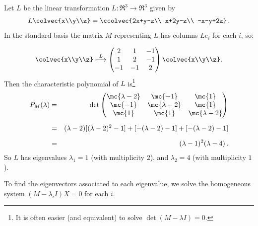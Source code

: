 \begin{example}
Let $L$ be the linear transformation $L \colon \Re^3\rightarrow \Re^3$ given by 
\[L\colvec{x\\y\\z}=\ccolvec{2x+y-z\\ x+2y-z\\ -x-y+2z}\, .\] 
In the standard basis the matrix $M$ representing $L$ has columns $Le_i$ for each $i$, so:

\[
\colvec{x\\y\\z} \stackrel{L}{\longmapsto} 
\begin{pmatrix}
2 & 1 & -1\\
1 & 2 & -1\\
-1 & -1 & 2\\
\end{pmatrix}\colvec{x\\y\\z}.
\]
Then the characteristic polynomial of $L$ is\footnote{It is often easier (and equivalent) to solve $\det (M-\lambda I)=0$.}
\begin{eqnarray*}
P_M(\lambda)&=&\det \begin{pmatrix}
\mc{\lambda - 2} &\mc{ -1} & \mc{1}\\
\mc{-1} &\mc{ \lambda - 2} & \mc{1}\\
\mc{1} & \mc{1} & \mc{\lambda - 2}\\
\end{pmatrix}\\[2mm]
&=& (\lambda - 2)[ (\lambda - 2)^2-1 ] + 
[-(\lambda - 2)-1 ] +
[-(\lambda - 2)-1] \\[2mm]
&=& (\lambda - 1)^2(\lambda - 4)\, .
\end{eqnarray*}
So $L$ has eigenvalues $\lambda_1=1$ (with multiplicity $2$), and $\lambda_2=4$ (with multiplicity $1$).

To find the eigenvectors associated to each eigenvalue, we solve the homogeneous system $(M-\lambda_iI)X=0$ for each $i$.


\end{example}
